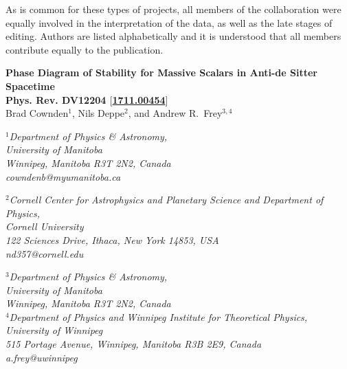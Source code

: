 \documentclass[../PhD.tex]{subfiles}
\begin{document}
As is common for these types of projects, all members of the collaboration were equally involved in the interpretation of the data, as well as the late stages of editing. Authors are listed alphabetically and it is understood that all members contribute equally to the publication.

\newpage


\begin{center}
{\bf{\Large Phase Diagram of Stability for Massive Scalars in Anti-de Sitter
Spacetime}} \\
\bigskip
{\bf Phys. Rev. DV12204 $\big[$\href{https://arxiv.org/abs/1711.00454}{1711.00454}$\big]$ } \\
\bigskip
\bigskip
Brad Cownden$^1$, Nils Deppe$^2$, and Andrew R.~Frey$^{3,4}$\\
\bigskip

$^1${\it Department of Physics \& Astronomy,\\ University of Manitoba\\
Winnipeg, Manitoba R3T 2N2, Canada \\ {\rm cowndenb@myumanitoba.ca}} \\
\vspace{0.1in}

$^2${\it Cornell Center for Astrophysics and Planetary Science and
Department of Physics,\\ Cornell University\\
122 Sciences Drive, Ithaca, New York 14853, USA \\ {\rm nd357@cornell.edu}} \\
\vspace{0.1in}

$^3${\it Department of Physics \& Astronomy,\\ University of Manitoba\\
Winnipeg, Manitoba R3T 2N2, Canada} \\
$^4${\it Department of Physics and Winnipeg Institute for Theoretical
Physics,\\ University of Winnipeg\\
515 Portage Avenue, Winnipeg, Manitoba R3B 2E9, Canada \\ {\rm a.frey@uwinnipeg}}
\end{center}

\bigskip
\end{document}

